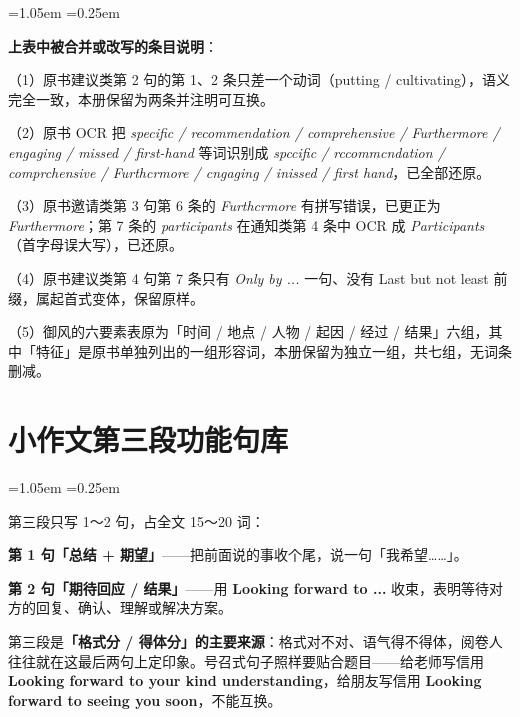 \documentclass[11pt,a4paper]{ctexart}
\newcommand{\kw}[1]{{\bfseries\color{accent}#1}}
\newenvironment{note}{%
  \par\addvspace{5pt}%
  \begin{list}{}{\leftmargin=1.05em \rightmargin=0.25em \listparindent=0pt
    \itemindent=0pt \topsep=0pt \parsep=2pt \itemsep=2pt \partopsep=0pt}%
  \item\relax\small\color{ink}%
}{%
  \end{list}\addvspace{5pt}%
}
\begin{document}
\begin{note}
\textbf{上表中被合并或改写的条目说明}：

（1）原书建议类第 2 句的第 1、2 条只差一个动词（putting / cultivating），语义完全一致，本册保留为两条并注明可互换。

（2）原书 OCR 把 \textit{specific / recommendation / comprehensive / Furthermore / engaging / missed / first-hand} 等词识别成 \textit{spccific / rccommcndation / comprchensive / Furthcrmore / cngaging / inissed / first hand}，已全部还原。

（3）原书邀请类第 3 句第 6 条的 \textit{Furthcrmore} 有拼写错误，已更正为 \textit{Furthermore}；第 7 条的 \textit{participants} 在通知类第 4 条中 OCR 成 \textit{Participants}（首字母误大写），已还原。

（4）原书建议类第 4 句第 7 条只有 \textit{Only by ...} 一句、没有 Last but not least 前缀，属起首式变体，保留原样。

（5）御风的六要素表原为「时间 / 地点 / 人物 / 起因 / 经过 / 结果」六组，其中「特征」是原书单独列出的一组形容词，本册保留为独立一组，共七组，无词条删减。
\end{note}


\section{小作文第三段功能句库}

\begin{note}
第三段只写 1～2 句，占全文 15～20 词：

\textbf{第 1 句「总结 + 期望」}——把前面说的事收个尾，说一句「我希望……」。

\textbf{第 2 句「期待回应 / 结果」}——用 \kw{Looking forward to ...} 收束，表明等待对方的回复、确认、理解或解决方案。

第三段是\textbf{「格式分 / 得体分」的主要来源}：格式对不对、语气得不得体，阅卷人往往就在这最后两句上定印象。号召式句子照样要贴合题目——给老师写信用 \kw{Looking forward to your kind understanding}，给朋友写信用 \kw{Looking forward to seeing you soon}，不能互换。
\end{note}
\end{document}
